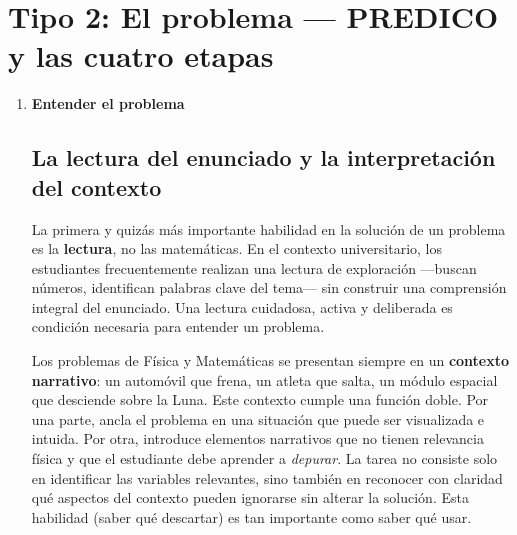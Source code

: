 \documentclass[11pt]{book}
\begin{document}
\section{Tipo 2: El problema --- PREDICO y las cuatro etapas}


\medskip
\begin{enumerate}

\item[A.] \textbf{Entender el problema}

\subsection*{La lectura del enunciado y la interpretación del contexto}

La primera y quizás más importante habilidad en la solución de un problema es la {\bf lectura}, no las matemáticas. En el contexto universitario, los estudiantes frecuentemente realizan una lectura de exploración —buscan números, identifican palabras clave del tema— sin construir una comprensión integral del enunciado. Una lectura cuidadosa, activa y deliberada es condición necesaria para entender un problema.

Los problemas de Física y Matemáticas se presentan siempre en un {\bf contexto narrativo}: un automóvil que frena, un atleta que salta, un módulo espacial que desciende sobre la Luna. Este contexto cumple una función doble. Por una parte, ancla el problema en una situación que puede ser visualizada e intuida. Por otra, introduce elementos narrativos que no tienen relevancia física y que el estudiante debe aprender a {\it depurar}. La tarea no consiste solo en identificar las variables relevantes, sino también en reconocer con claridad qué aspectos del contexto pueden ignorarse sin alterar la solución. Esta habilidad (saber qué descartar) es tan importante como saber qué usar.


\end{enumerate}
\end{document}
